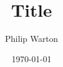 \documentclass{article}
\begin{document}
\title{Title}
\author{Philip Warton}
\date{\today}
\maketitle
\end{document}

